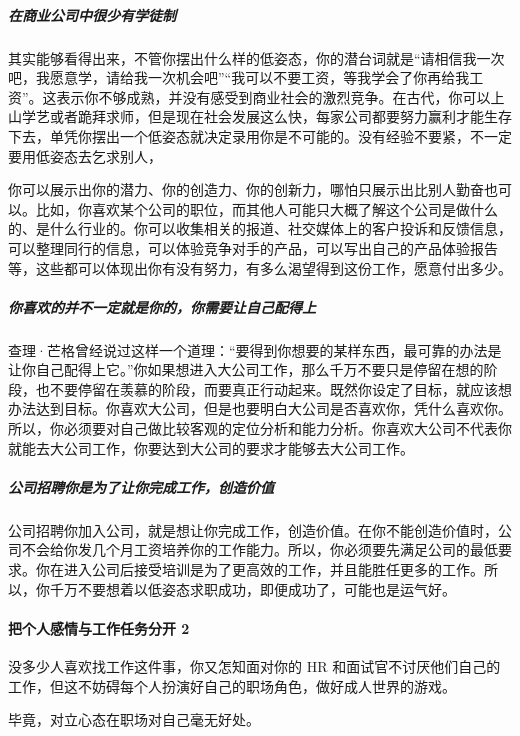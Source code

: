 \documentclass[letterpaper,11pt,english]{sphinxmanual}
\begin{document}
\subparagraph{在商业公司中很少有学徒制}
\label{\detokenize{chapter_interview/xintai:id3}}
其实能够看得出来，不管你摆出什么样的低姿态，你的潜台词就是“请相信我一次吧，我愿意学，请给我一次机会吧”“我可以不要工资，等我学会了你再给我工资”。这表示你不够成熟，并没有感受到商业社会的激烈竞争。在古代，你可以上山学艺或者跪拜求师，但是现在社会发展这么快，每家公司都要努力赢利才能生存下去，单凭你摆出一个低姿态就决定录用你是不可能的。没有经验不要紧，不一定要用低姿态去乞求别人，

你可以展示出你的潜力、你的创造力、你的创新力，哪怕只展示出比别人勤奋也可以。比如，你喜欢某个公司的职位，而其他人可能只大概了解这个公司是做什么的、是什么行业的。你可以收集相关的报道、社交媒体上的客户投诉和反馈信息，可以整理同行的信息，可以体验竞争对手的产品，可以写出自己的产品体验报告等，这些都可以体现出你有没有努力，有多么渴望得到这份工作，愿意付出多少。


\subparagraph{你喜欢的并不一定就是你的，你需要让自己配得上}
\label{\detokenize{chapter_interview/xintai:id4}}
查理·芒格曾经说过这样一个道理：“要得到你想要的某样东西，最可靠的办法是让你自己配得上它。”你如果想进入大公司工作，那么千万不要只是停留在想的阶段，也不要停留在羡慕的阶段，而要真正行动起来。既然你设定了目标，就应该想办法达到目标。你喜欢大公司，但是也要明白大公司是否喜欢你，凭什么喜欢你。所以，你必须要对自己做比较客观的定位分析和能力分析。你喜欢大公司不代表你就能去大公司工作，你要达到大公司的要求才能够去大公司工作。


\subparagraph{公司招聘你是为了让你完成工作，创造价值}
\label{\detokenize{chapter_interview/xintai:id5}}
公司招聘你加入公司，就是想让你完成工作，创造价值。在你不能创造价值时，公司不会给你发几个月工资培养你的工作能力。所以，你必须要先满足公司的最低要求。你在进入公司后接受培训是为了更高效的工作，并且能胜任更多的工作。所以，你千万不要想着以低姿态求职成功，即便成功了，可能也是运气好。


\paragraph{把个人感情与工作任务分开 2\sphinxfootnotemark[752]}
\label{\detokenize{chapter_interview/xintai:id6}}%
\begin{footnotetext}[752]\sphinxAtStartFootnote
{}
%
\end{footnotetext}\ignorespaces 
没多少人喜欢找工作这件事，你又怎知面对你的 HR
和面试官不讨厌他们自己的工作，但这不妨碍每个人扮演好自己的职场角色，做好成人世界的游戏。

毕竟，对立心态在职场对自己毫无好处。
\end{document}
